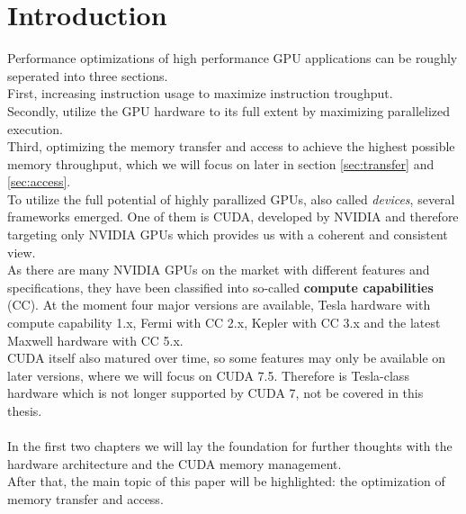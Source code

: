 \section{Introduction}
\label{sec:intro}
Performance optimizations of high performance GPU applications can be roughly seperated into three sections.\\
First, increasing instruction usage to maximize instruction troughput.\\
Secondly, utilize the GPU hardware to its full extent by maximizing parallelized execution.\\
Third, optimizing the memory transfer and access to achieve the highest possible memory throughput, which we will focus on later in section \ref{sec:transfer} and \ref{sec:access}.
\\
To utilize the full potential of highly parallized GPUs, also called \emph{devices},
several frameworks emerged. One of them is CUDA, developed by NVIDIA and therefore targeting only NVIDIA GPUs which
provides us with a coherent and consistent view.\\
As there are many NVIDIA GPUs on the market with different features and specifications, they have been
classified into so-called \textbf{compute capabilities} (CC). At the moment four major versions are available,
Tesla hardware with compute capability 1.x, Fermi with CC 2.x, Kepler with CC 3.x and the latest Maxwell hardware with CC 5.x.\\
CUDA itself also matured over time, so some features may only be available on later versions, where we will focus on CUDA 7.5. 
Therefore is Tesla-class hardware which is not longer supported by CUDA 7\cite{c_prog_guide_cc}, not be covered in this thesis.\\\\

In the first two chapters we will lay the foundation for further thoughts with the hardware architecture  and the CUDA memory management.\\
After that, the main topic of this paper will be highlighted: the optimization of memory transfer and access.\\
